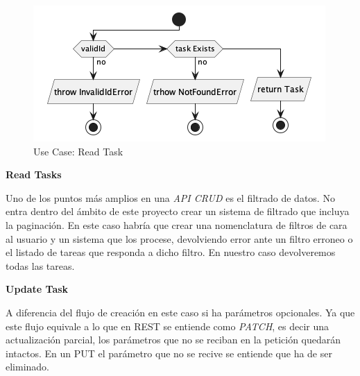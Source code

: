 \begin{figure}[H]
    \centering
    \includegraphics[height=0.15\textheight]{./part/Proyecto_ejecutivo/memoria_descriptiva/descripcionDelProyecto/manager/uml/getTaskUseCase}
    \caption{Use Case: Read Task}\label{fig:Use Case-Read Task}
\end{figure}

\textbf{Read Tasks}

Uno de los puntos más amplios en una \textit{API CRUD} es el filtrado de datos. No entra dentro del ámbito de este proyecto crear un sistema de filtrado que incluya la paginación. En este caso habría que crear una nomenclatura de filtros de cara al usuario y un sistema que los procese, devolviendo error ante un filtro erroneo o el listado de tareas que responda a dicho filtro. En nuestro caso devolveremos todas las tareas.

\textbf{Update Task}

A diferencia del flujo de creación en este caso si ha parámetros opcionales. Ya que este flujo equivale a lo que en REST se entiende como \textit{PATCH}, es decir una actualización parcial, los parámetros que no se reciban en la petición quedarán intactos. En un PUT el parámetro que no se recive se entiende que ha de ser eliminado.

